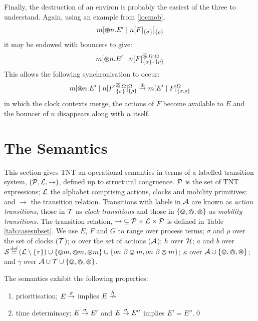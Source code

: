 Finally, the destruction of an environ is probably the easiest of the
three to understand.  Again, using an example from \ref{locmob},
\begin{equation}
{m}[ \varoast n.E^\prime\;|\;{n}[ F ]_{\{\sigma\}} ]_{\{\rho\}}
\end{equation}
it may be endowed with bouncers to give:
\begin{equation}
{m}[ \varoast n.E^\prime \;|\; {n}[ F ]^{\overline{\varoast}.\Omega}_{\{\sigma\}} ]^{\Omega}_{\{\rho\}}
\end{equation}
This allows the following synchronisation to occur:
\begin{equation}
{m}[ \varoast n.E^\prime \;|\; {n}[ F ]^{\overline{\varoast}.\Omega}_{\{\sigma\}} ]^{\Omega}_{\{\rho\}}
\stackrel{\varoast}{\rightarrow}
{m}[ E^\prime \;|\; {F} ]^{\Omega}_{\{\sigma, \rho\}}
\end{equation}
in which the clock contexts merge, the actions of $F$ become
available to $E$ and the bouncer of $n$ disappears along with $n$
itself.

\section{The Semantics}
\label{tntsemantics}

This section gives TNT an operational semantics in terms of a labelled
transition system, $(\text{$\mathcal{P}$}, \text{$\mathcal{L}$}, \rightarrow)$, defined
up to structural congruence.  $\text{$\mathcal{P}$}$ is the set of TNT expressions; $\text{$\mathcal{L}$}$ the
alphabet comprising actions, clocks and mobility primitives; and $\rightarrow$ the
transition relation.  Transitions with labels in
$\text{$\mathcal{A}$}$ are known as \emph{action transitions}, those in $\text{$\mathcal{T}$}$ as
\emph{clock transitions} and those in $\text{$\{ \varovee, \varowedge , \varoast\}$}$ as \emph{mobility
transitions}.  The transition relation, $\mathop{\rightarrow} \mathrel{\subseteq}
\text{$\mathcal{P}$} \times \text{$\mathcal{L}$} \times \text{$\mathcal{P}$}$ is defined in Table \ref{tab:casesubset}.
We use $E$, $F$ and $G$ to range over process terms; $\sigma$ and $\rho$ over the
set of clocks ($\text{$\mathcal{T}$}$); $\alpha$ over the set of actions
($\text{$\mathcal{A}$}$); $h$ over $\text{$\mathcal{H}$}$; $a$ and $b$ over 
$\text{$\mathcal{S}$} \operatorname{\stackrel{\textrm{def}}{=}}
\left(\text{$\mathcal{L}$} \setminus \{\tau\}\right) 
\cup 
\{ \varovee m, \varowedge m, \varoast m \} 
\cup
\{ on\ \beta \varovee m, on\ \beta \varowedge m \}
$;
$\kappa$ over $\text{$\mathcal{A}$} \cup \text{$\{ \varovee, \varowedge , \varoast\}$}$;
and $\gamma$ over $\text{$\mathcal{A}$} \cup \text{$\mathcal{T}$} \cup \text{$\{ \varovee, \varowedge , \varoast\}$}$.

\begin{proposition}
The semantics exhibit the following properties:
\begin{enumerate}
\item prioritisation;
$E \stackrel{\sigma}{\rightarrow}$ implies $E \stackrel{h}{\nrightarrow}$ 
\item time determinacy; $E \stackrel{\sigma}{\rightarrow} E'$ and $E
\stackrel{\sigma}{\rightarrow} E''$ implies $E' = E''$.\qed
\end{enumerate}
\end{proposition}

